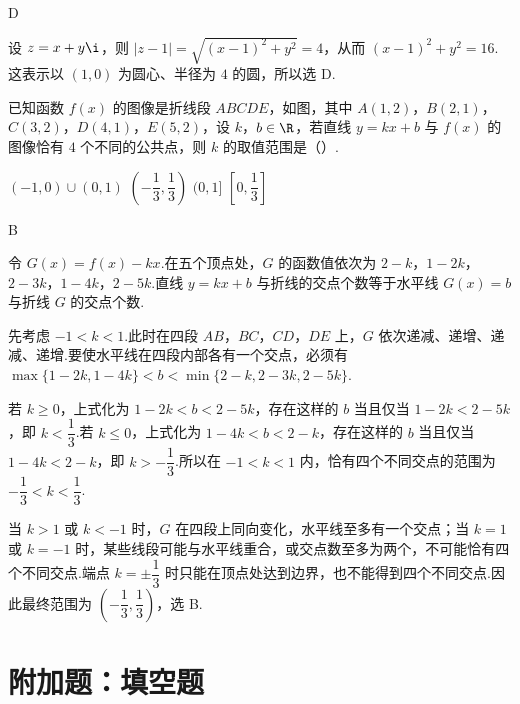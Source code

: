 \begin{answer}
D
\end{answer}

\begin{solution}
设 \(z=x+y\i\)，则
\(\lvert z-1\rvert=\sqrt{(x-1)^2+y^2}=4\)，从而 \((x-1)^2+y^2=16\).这表示以 \((1,0)\) 为圆心、半径为 \(4\) 的圆，所以选 D.
\end{solution}

\begin{problem}
已知函数 \(f(x)\) 的图像是折线段 \(ABCDE\)，如图，其中 \(A(1,2)\)，\(B(2,1)\)，\(C(3,2)\)，\(D(4,1)\)，\(E(5,2)\)，设 \(k\)，\(b\in\R\)，若直线 \(y=kx+b\) 与 \(f(x)\) 的图像恰有 \(4\) 个不同的公共点，则 \(k\) 的取值范围是（\quad）.


\choices
    {\((-1,0)\cup(0,1)\)}
    {\(\left(-\dfrac13,\dfrac13\right)\)}
    {\((0,1]\)}
    {\(\left[0,\dfrac13\right]\)}
\end{problem}

\begin{answer}
B
\end{answer}

\begin{solution}
令 \(G(x)=f(x)-kx\).在五个顶点处，\(G\) 的函数值依次为
\(2-k\)，\(1-2k\)，\(2-3k\)，\(1-4k\)，\(2-5k\).直线 \(y=kx+b\) 与折线的交点个数等于水平线 \(G(x)=b\) 与折线 \(G\) 的交点个数.

先考虑 \(-1<k<1\).此时在四段 \(AB\)，\(BC\)，\(CD\)，\(DE\) 上，\(G\) 依次递减、递增、递减、递增.要使水平线在四段内部各有一个交点，必须有
\(\max\{1-2k,1-4k\}<b<\min\{2-k,2-3k,2-5k\}\).

若 \(k\geq0\)，上式化为 \(1-2k<b<2-5k\)，存在这样的 \(b\) 当且仅当 \(1-2k<2-5k\)，即 \(k<\dfrac13\).若 \(k\leq0\)，上式化为 \(1-4k<b<2-k\)，存在这样的 \(b\) 当且仅当 \(1-4k<2-k\)，即 \(k>-\dfrac13\).所以在 \(-1<k<1\) 内，恰有四个不同交点的范围为 \(-\dfrac13<k<\dfrac13\).

当 \(k>1\) 或 \(k<-1\) 时，\(G\) 在四段上同向变化，水平线至多有一个交点；当 \(k=1\) 或 \(k=-1\) 时，某些线段可能与水平线重合，或交点数至多为两个，不可能恰有四个不同交点.端点 \(k=\pm\dfrac13\) 时只能在顶点处达到边界，也不能得到四个不同交点.因此最终范围为 \(\left(-\dfrac13,\dfrac13\right)\)，选 B.
\end{solution}

\section{附加题：填空题}

